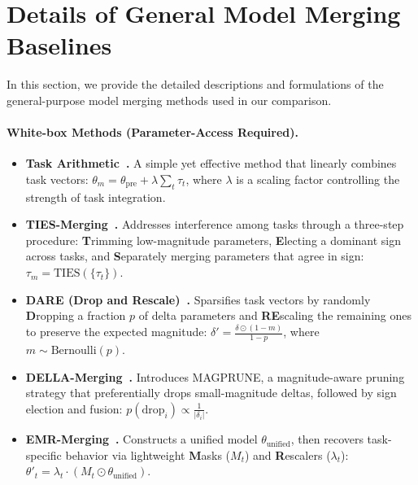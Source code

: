 \section{Details of General Model Merging Baselines}
\label{sec:general_baseline_details}

In this section, we provide the detailed descriptions and formulations of the general-purpose model merging methods used in our comparison.

\paragraph{White-box Methods (Parameter-Access Required).}
\begin{itemize}[leftmargin=*, align=left]
    \item \textbf{Task Arithmetic~\cite{ilharco2022editing}.} 
    A simple yet effective method that linearly combines task vectors:
    $\theta_m = \theta_{\text{pre}} + \lambda \sum_t \tau_t$, 
    where $\lambda$ is a scaling factor controlling the strength of task integration.

    \item \textbf{TIES-Merging~\cite{yadav2023ties}.} 
    Addresses interference among tasks through a three-step procedure: \textbf{T}rimming low-magnitude parameters, \textbf{E}lecting a dominant sign across tasks, and \textbf{S}eparately merging parameters that agree in sign:
    $\tau_m = \text{TIES}(\{\tau_t\})$.

    \item \textbf{DARE (Drop and Rescale)~\cite{yu2024languagemodelssupermario}.} 
    Sparsifies task vectors by randomly \textbf{D}ropping a fraction $p$ of delta parameters and \textbf{RE}scaling the remaining ones to preserve the expected magnitude:
    $\delta' = \frac{\delta \odot (1 - m)}{1 - p}$, where $m \sim \text{Bernoulli}(p)$.

    \item \textbf{DELLA-Merging~\cite{deep2024dellamergingreducinginterferencemodel}.} 
    Introduces MAGPRUNE, a magnitude-aware pruning strategy that preferentially drops small-magnitude deltas, followed by sign election and fusion:
    $p(\text{drop}_i) \propto \frac{1}{|\delta_i|}$.

    \item \textbf{EMR-Merging~\cite{huang2024emr}.} 
    Constructs a unified model $\theta_{\text{unified}}$, then recovers task-specific behavior via lightweight \textbf{M}asks ($M_t$) and \textbf{R}escalers ($\lambda_t$):
    $\theta'_t = \lambda_t \cdot (M_t \odot \theta_{\text{unified}})$.


\end{itemize}
